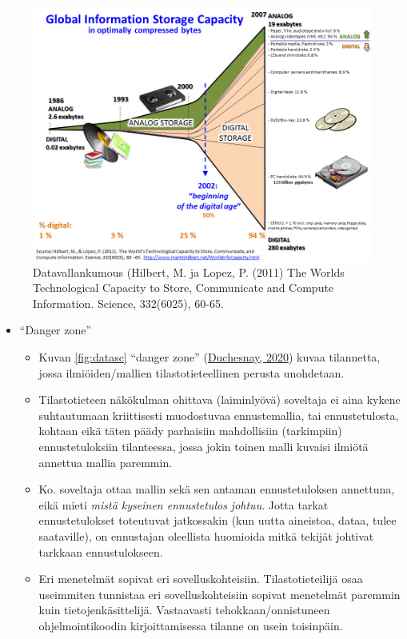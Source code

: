 \documentclass[
]{book}
\providecommand{\tightlist}{%
  \setlength{\itemsep}{0pt}\setlength{\parskip}{0pt}}
\begin{document}
\begin{figure}

{\centering \includegraphics[width=1\linewidth]{images/datarevolution} 

}

\caption{Datavallankumous (Hilbert, M. ja Lopez, P. (2011) The Worlds Technological Capacity to Store, Communicate and Compute Information. Science, 332(6025), 60-65.}\label{fig:datarevolution}
\end{figure}

\begin{itemize}
\tightlist
\item
  ``Danger zone''

  \begin{itemize}
  \tightlist
  \item
    Kuvan \ref{fig:datasc} ``danger zone'' (\href{https://duchesnay.github.io/pystatsml/introduction/machine_learning.html}{Duchesnay, 2020}) kuvaa tilannetta, jossa ilmiöiden/mallien tilastotieteellinen perusta unohdetaan.
  \item
    Tilastotieteen näkökulman ohittava (laiminlyövä) soveltaja ei aina kykene suhtautumaan kriittisesti muodostuvaa ennustemallia, tai ennustetulosta, kohtaan eikä täten päädy parhaisiin mahdollisiin (tarkimpiin) ennustetuloksiin tilanteessa, jossa jokin toinen malli kuvaisi ilmiötä annettua mallia paremmin.
  \item
    Ko. soveltaja ottaa mallin sekä sen antaman ennustetuloksen annettuna, eikä mieti \emph{mistä kyseinen ennustetulos johtuu}. Jotta tarkat ennustetulokset toteutuvat jatkossakin (kun uutta aineistoa, dataa, tulee saataville), on ennustajan oleellista huomioida mitkä tekijät johtivat tarkkaan ennustulokseen.
  \item
    Eri menetelmät sopivat eri sovelluskohteisiin. Tilastotieteilijä osaa useimmiten tunnistaa eri sovelluskohteisiin sopivat menetelmät paremmin kuin tietojenkäsittelijä. Vastaavasti tehokkaan/onnistuneen ohjelmointikoodin kirjoittamisessa tilanne on usein toisinpäin.
  \end{itemize}
\end{itemize}
\end{document}
